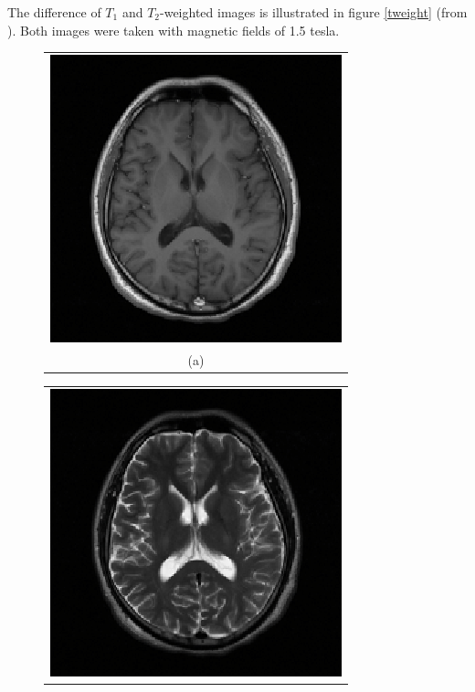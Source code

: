 The difference of \(T_1\) and \(T_2\)-weighted images is illustrated in figure \ref{tweight} (from \cite{eng08}). Both images were taken with magnetic fields of 1.5 tesla. 
\begin{figure}[h!]
\centering
\begin{minipage}{.4\textwidth}
\begin{tabular}{c}
\includegraphics[width=\textwidth]{backgroundTheory/medicalImaging/T1} \\
(a)
\end{tabular}
\end{minipage}
\begin{minipage}{.4\textwidth}
\begin{tabular}{c}
\includegraphics[width=\textwidth]{backgroundTheory/medicalImaging/T2} \\

\end{tabular}
\end{minipage}
\end{figure}
